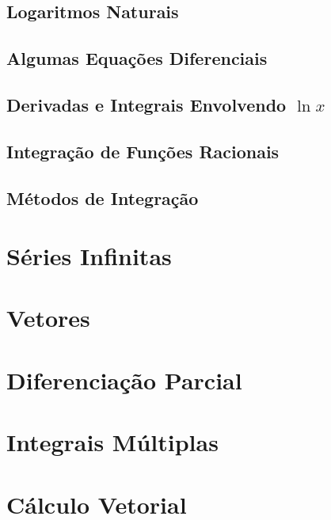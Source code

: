 \documentclass{svmono}
\begin{document}
\section{Logaritmos Naturais}
\label{sec:natlog}

\section{Algumas Equações Diferenciais}
\label{sec:diffeq}

\section{Derivadas e Integrais Envolvendo $\ln x$}
\label{sec:derivln}

\section{Integração de Funções Racionais}
\label{sec:intratfunc}

\section{Métodos de Integração}
\label{sec:methodint}

\chapterproblems

\chapter{Séries Infinitas}
\label{chp:infseries}

\chapterproblems

\chapter{Vetores}
\label{chp:vectors}

\chapterproblems

\chapter{Diferenciação Parcial}
\label{chp:partialdiff}

\chapterproblems

\chapter{Integrais Múltiplas}
\label{chp:multipleint}

\chapterproblems

\chapter{Cálculo Vetorial}
\label{chp:vectorcalculus}
\end{document}
